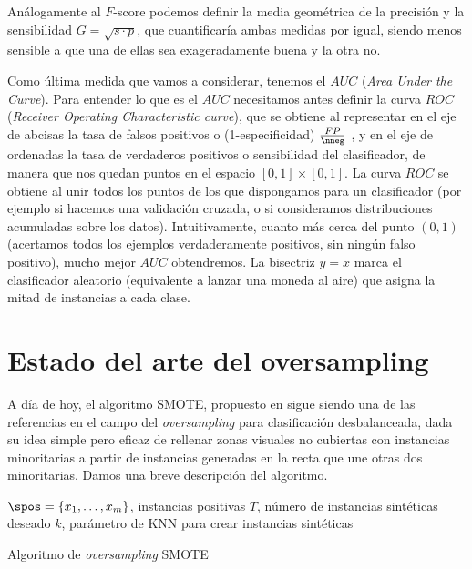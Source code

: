 Análogamente al $F$-score podemos definir la media geométrica de la precisión y la sensibilidad $G = \sqrt{s\cdot p}$, que
cuantificaría ambas medidas por igual, siendo menos sensible a que una de ellas sea exageradamente buena y la otra no.

Como última medida que vamos a considerar, tenemos el $AUC$ (\textit{Area Under the Curve}). Para entender lo que es el $AUC$
necesitamos antes definir la curva $ROC$ (\textit{Receiver Operating Characteristic curve}), que se obtiene al representar en el eje
de abcisas la tasa de falsos positivos o (1-especificidad) $\frac{FP}{\nneg}$ , y en el eje de ordenadas la tasa de verdaderos positivos
o sensibilidad del clasificador, de manera que nos quedan puntos en el espacio $[0,1]\times [0,1]$. La curva $ROC$ se obtiene al unir 
todos los puntos de los que dispongamos para un clasificador (por ejemplo si hacemos una validación cruzada, o si consideramos distribuciones
acumuladas sobre los datos). Intuitivamente, cuanto más cerca del punto $(0,1)$ (acertamos todos los ejemplos verdaderamente positivos,
sin ningún falso positivo), mucho mejor $AUC$ obtendremos. La bisectriz $y=x$ marca el clasificador aleatorio (equivalente a lanzar 
una moneda al aire) que asigna la mitad de instancias a cada clase.


\section{Estado del arte del oversampling}
A día de hoy, el algoritmo SMOTE, propuesto en \citep{chawla02} sigue siendo una de las referencias en el campo del 
\textit{oversampling} para clasificación desbalanceada, dada su idea simple pero eficaz de rellenar zonas visuales no 
cubiertas con instancias minoritarias a partir de instancias generadas en la recta que une otras dos 
minoritarias. Damos una breve descripción del algoritmo.

\begin{algorithm}[H]
\begin{algorithmic}[1]
  \REQUIRE $\spos = \{x_1, \ldots, x_m\}$, instancias positivas
  \REQUIRE $T$, número de instancias sintéticas deseado
  \REQUIRE $k$, parámetro de KNN para crear instancias sintéticas
  \NEWLINE
    \ENDFOR
  \ENDFOR
  \NEWLINE
\end{algorithmic}
\caption{Algoritmo de \textit{oversampling} SMOTE}
\label{alg:smote}
\end{algorithm}
